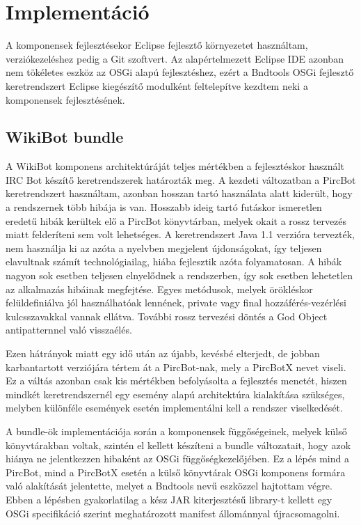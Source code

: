 \chapter{Implementáció}
\label{cha:implementation}

A komponensek fejlesztésekor Eclipse fejlesztő környezetet használtam, verziókezeléshez pedig a Git szoftvert. Az alapértelmezett Eclipse IDE azonban nem tökéletes eszköz az OSGi alapú fejlesztéshez, ezért a Bndtools \cite{bndtools} OSGi fejlesztő keretrendszert Eclipse kiegészítő modulként feltelepítve kezdtem neki a komponensek fejlesztésének.

\section{WikiBot bundle}
\label{sec:wikibotbundle}

A WikiBot komponens architektúráját teljes mértékben a fejlesztéskor használt IRC Bot készítő keretrendszerek határozták meg. A kezdeti változatban a PircBot \cite{pircbot} keretrendszert használtam, azonban hosszan tartó használata alatt kiderült, hogy a rendszernek több hibája is van. Hosszabb ideig tartó futáskor ismeretlen eredetű hibák kerültek elő a PircBot könyvtárban, melyek okait a rossz tervezés miatt felderíteni sem volt lehetséges. A keretrendszert Java 1.1 verzióra tervezték, nem használja ki az azóta a nyelvben megjelent újdonságokat, így teljesen elavultnak számít technológiailag, hiába fejlesztik azóta folyamatosan. A hibák nagyon sok esetben teljesen elnyelődnek a rendszerben, így sok esetben lehetetlen az alkalmazás hibáinak megfejtése. Egyes metódusok, melyek örökléskor felüldefiniálva jól használhatóak lennének, private vagy final hozzáférés-vezérlési kulcsszavakkal vannak ellátva. További rossz tervezési döntés a God Object antipatternnel való visszaélés.

Ezen hátrányok miatt egy idő után az újabb, kevésbé elterjedt, de jobban karbantartott verziójára tértem át a PircBot-nak, mely a PircBotX \cite{pircbotx} nevet viseli. Ez a váltás azonban csak kis mértékben befolyásolta a fejlesztés menetét, hiszen mindkét keretrendszernél egy esemény alapú architektúra kialakítása szükséges, melyben különféle események esetén implementálni kell a rendszer viselkedését.

A bundle-ök implementációja során a komponensek függőségeinek, melyek külső könyvtárakban voltak, szintén el kellett készíteni a bundle változatait, hogy azok hiánya ne jelentkezzen hibaként az OSGi függőségkezelőjében. Ez a lépés mind a PircBot, mind a PircBotX esetén a külső könyvtárak OSGi komponens formára való alakítását jelentette, melyet a Bndtools nevű eszközzel hajtottam végre. Ebben a lépésben gyakorlatilag a kész JAR kiterjesztésű library-t kellett egy OSGi specifikáció szerint meghatározott manifest állománnyal újracsomagolni.

